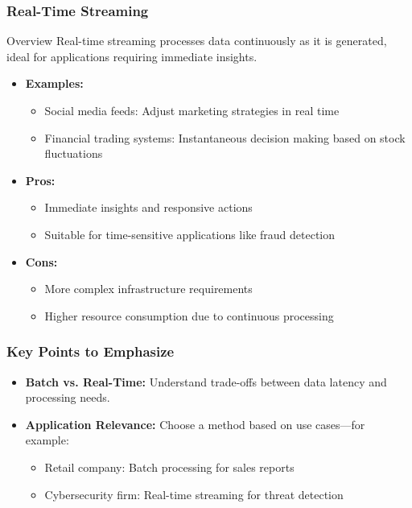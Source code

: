 \documentclass[aspectratio=169]{beamer}
\begin{document}
\begin{frame}[fragile]
  \frametitle{Real-Time Streaming}
  \begin{block}{Overview}
    Real-time streaming processes data continuously as it is generated, ideal for applications requiring immediate insights.
  \end{block}
  \begin{itemize}
    \item \textbf{Examples:}
    \begin{itemize}
      \item Social media feeds: Adjust marketing strategies in real time
      \item Financial trading systems: Instantaneous decision making based on stock fluctuations
    \end{itemize}
    \item \textbf{Pros:}
    \begin{itemize}
      \item Immediate insights and responsive actions
      \item Suitable for time-sensitive applications like fraud detection
    \end{itemize}
    \item \textbf{Cons:}
    \begin{itemize}
      \item More complex infrastructure requirements
      \item Higher resource consumption due to continuous processing
    \end{itemize}
  \end{itemize}
\end{frame}

\begin{frame}[fragile]
  \frametitle{Key Points to Emphasize}
  \begin{itemize}
    \item \textbf{Batch vs. Real-Time:} Understand trade-offs between data latency and processing needs.
    \item \textbf{Application Relevance:} Choose a method based on use cases—for example:
    \begin{itemize}
      \item Retail company: Batch processing for sales reports
      \item Cybersecurity firm: Real-time streaming for threat detection
    \end{itemize}
  \end{itemize}
\end{frame}
\end{document}
